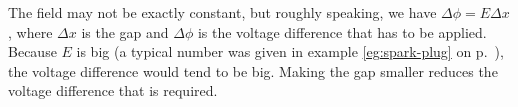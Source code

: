 The field may not be exactly constant, but roughly speaking, we have
$\Delta\phi = E \Delta x$, where $\Delta x$ is the gap and $\Delta\phi$
is the voltage difference that has to be applied. Because $E$ is big
(a typical number was given in
example \ref{eg:spark-plug} on p.~\pageref{eg:spark-plug}),
the voltage difference would tend to be big. Making the gap smaller
reduces the voltage difference that is required.
